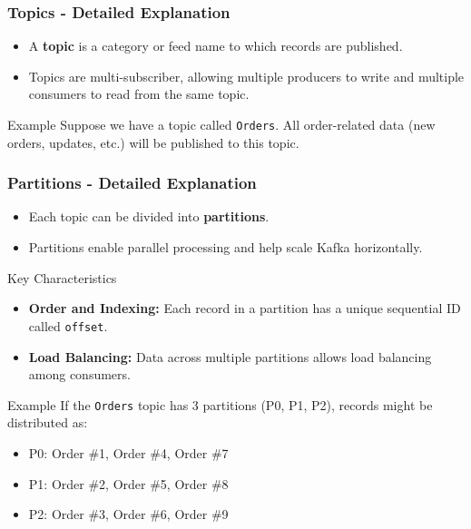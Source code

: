 \documentclass[aspectratio=169]{beamer}
\begin{document}
\begin{frame}[fragile]
    \frametitle{Topics - Detailed Explanation}
    \begin{itemize}
        \item A \textbf{topic} is a category or feed name to which records are published. 
        \item Topics are multi-subscriber, allowing multiple producers to write and multiple consumers to read from the same topic.
    \end{itemize}
    
    \begin{block}{Example}
        Suppose we have a topic called \texttt{Orders}. All order-related data (new orders, updates, etc.) will be published to this topic.
    \end{block}
\end{frame}

\begin{frame}[fragile]
    \frametitle{Partitions - Detailed Explanation}
    \begin{itemize}
        \item Each topic can be divided into \textbf{partitions}.
        \item Partitions enable parallel processing and help scale Kafka horizontally.
    \end{itemize}
    
    \begin{block}{Key Characteristics}
        \begin{itemize}
            \item \textbf{Order and Indexing:} Each record in a partition has a unique sequential ID called \texttt{offset}.
            \item \textbf{Load Balancing:} Data across multiple partitions allows load balancing among consumers.
        \end{itemize}
    \end{block}

    \begin{block}{Example}
        If the \texttt{Orders} topic has 3 partitions (P0, P1, P2), records might be distributed as:
        \begin{itemize}
            \item P0: Order \#1, Order \#4, Order \#7
            \item P1: Order \#2, Order \#5, Order \#8
            \item P2: Order \#3, Order \#6, Order \#9
        \end{itemize}
    \end{block}
\end{frame}
\end{document}
